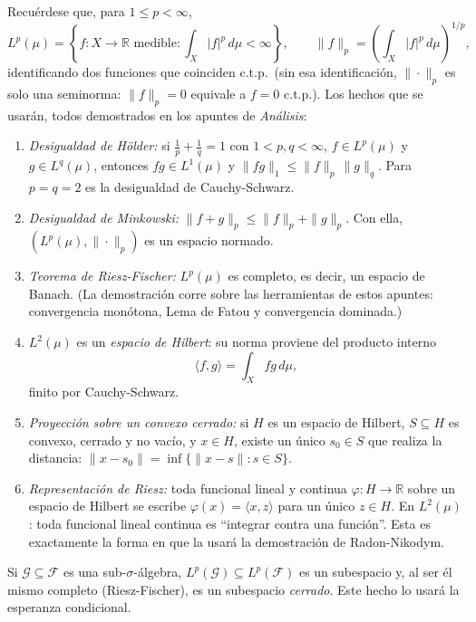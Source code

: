 \documentclass[11pt, a4paper]{article}
\begin{document}
Recuérdese que, para $1 \le p < \infty$,
$$ L^p(\mu) = \left\{ f : X \to \mathbb{R} \text{ medible} : \int_X |f|^p \, d\mu < \infty
\right\}, \qquad \|f\|_p = \left( \int_X |f|^p \, d\mu \right)^{1/p}, $$
identificando dos funciones que coinciden c.t.p.\ (sin esa identificación, $\|\cdot\|_p$ es
solo una seminorma: $\|f\|_p = 0$ equivale a $f = 0$ c.t.p.). Los hechos que se usarán, todos
demostrados en los apuntes de \emph{Análisis}:

\begin{enumerate}
    \item \emph{Desigualdad de Hölder:} si $\tfrac{1}{p} + \tfrac{1}{q} = 1$ con
    $1 < p, q < \infty$, $f \in L^p(\mu)$ y $g \in L^q(\mu)$, entonces $fg \in L^1(\mu)$ y
    $\|fg\|_1 \le \|f\|_p \, \|g\|_q$. Para $p = q = 2$ es la desigualdad de Cauchy-Schwarz.
    \item \emph{Desigualdad de Minkowski:} $\|f + g\|_p \le \|f\|_p + \|g\|_p$. Con ella,
    $(L^p(\mu), \|\cdot\|_p)$ es un espacio normado.
    \item \emph{Teorema de Riesz-Fischer:} $L^p(\mu)$ es completo, es decir, un espacio de
    Banach. (La demostración corre sobre las herramientas de estos apuntes: convergencia
    monótona, Lema de Fatou y convergencia dominada.)
    \item $L^2(\mu)$ es un \emph{espacio de Hilbert}: su norma proviene del producto interno
    $$ \langle f, g \rangle = \int_X f g \, d\mu, $$
    finito por Cauchy-Schwarz.
    \item \emph{Proyección sobre un convexo cerrado:} si $H$ es un espacio de Hilbert,
    $S \subseteq H$ es convexo, cerrado y no vacío, y $x \in H$, existe un único $s_0 \in S$
    que realiza la distancia: $\|x - s_0\| = \inf\{\|x - s\| : s \in S\}$.
    \item \emph{Representación de Riesz:} toda funcional lineal y continua
    $\varphi: H \to \mathbb{R}$ sobre un espacio de Hilbert se escribe $\varphi(x) =
    \langle x, z \rangle$ para un único $z \in H$. En $L^2(\mu)$: toda funcional lineal
    continua es ``integrar contra una función''. Esta es exactamente la forma en que la
    usará la demostración de Radon-Nikodym.
\end{enumerate}

\obs Si $\mathcal{G} \subseteq \mathcal{F}$ es una sub-$\sigma$-álgebra,
$L^p(\mathcal{G}) \subseteq L^p(\mathcal{F})$ es un subespacio y, al ser él mismo completo
(Riesz-Fischer), es un subespacio \emph{cerrado}. Este hecho lo usará la esperanza
condicional.
\end{document}
